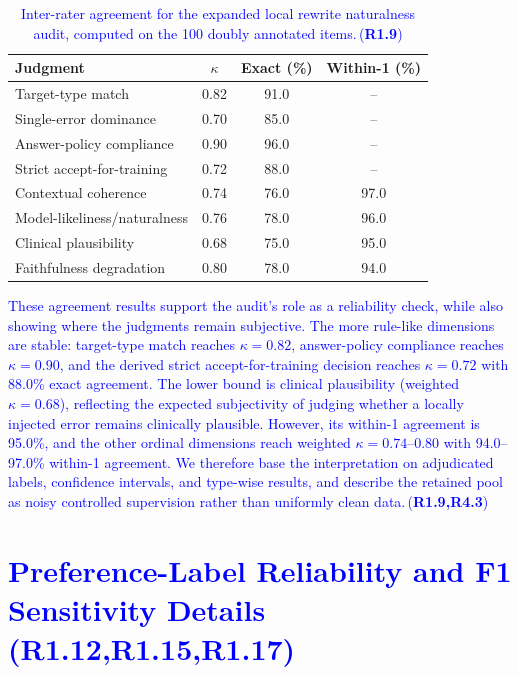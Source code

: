 \documentclass[a4paper,fleqn,doubleblind]{cas-sc}
\DeclareRobustCommand{\added}[1]{\textcolor{blue}{#1}}
\DeclareRobustCommand{\revtag}[1]{\textcolor{blue}{\scriptsize\,(\textbf{#1})}}
\begin{document}
\begin{table}[htbp]
    \centering
    \caption{\added{Inter-rater agreement for the expanded local rewrite naturalness audit, computed on the 100 doubly annotated items.}\revtag{R1.9}}
    \label{tab:ordinal_agreement}
    \begin{tabular}{lccc}
        \toprule
        \textbf{Judgment} & \textbf{$\kappa$} & \textbf{Exact (\%)} & \textbf{Within-1 (\%)} \\
        \midrule
        Target-type match & 0.82 & 91.0 & -- \\
        Single-error dominance & 0.70 & 85.0 & -- \\
        Answer-policy compliance & 0.90 & 96.0 & -- \\
        Strict accept-for-training & 0.72 & 88.0 & -- \\
        Contextual coherence & 0.74 & 76.0 & 97.0 \\
        Model-likeliness/naturalness & 0.76 & 78.0 & 96.0 \\
        Clinical plausibility & 0.68 & 75.0 & 95.0 \\
        Faithfulness degradation & 0.80 & 78.0 & 94.0 \\
        \bottomrule
\end{tabular}
\end{table}

\added{These agreement results support the audit's role as a reliability check, while also showing where the judgments remain subjective. The more rule-like dimensions are stable: target-type match reaches $\kappa=0.82$, answer-policy compliance reaches $\kappa=0.90$, and the derived strict accept-for-training decision reaches $\kappa=0.72$ with 88.0\% exact agreement. The lower bound is clinical plausibility (weighted $\kappa=0.68$), reflecting the expected subjectivity of judging whether a locally injected error remains clinically plausible. However, its within-1 agreement is 95.0\%, and the other ordinal dimensions reach weighted $\kappa=0.74$--0.80 with 94.0--97.0\% within-1 agreement. We therefore base the interpretation on adjudicated labels, confidence intervals, and type-wise results, and describe the retained pool as noisy controlled supervision rather than uniformly clean data.}\revtag{R1.9,R4.3}

\section{\added{Preference-Label Reliability and F1 Sensitivity Details}\revtag{R1.12,R1.15,R1.17}}
\label{app:preference_label_details}
\end{document}

